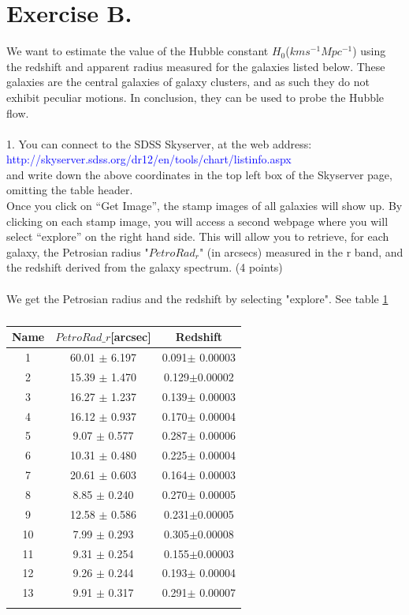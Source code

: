 \documentclass[11pt,a4paper,twoside]{article}
\begin{document}
	\section*{Exercise B.}
We want to estimate the value of the Hubble constant $H_0$($km s^{-1}Mpc^{-1}$) using the
redshift and apparent radius measured for the galaxies listed below. These galaxies are the
central galaxies of galaxy clusters, and as such they do not exhibit peculiar motions. In
conclusion, they can be used to probe the Hubble flow.\\
\\1. You can connect to the SDSS Skyserver, at the web address:\\
\textcolor{blue}{http://skyserver.sdss.org/dr12/en/tools/chart/listinfo.aspx}\\
and write down the above coordinates in the top left box of the Skyserver page, omitting the
table header.\\
Once you click on “Get Image”, the stamp images of all galaxies will show up. By clicking on
each stamp image, you will access a second webpage where you will select “explore” on the
right hand side. This will allow you to retrieve, for each galaxy, the Petrosian radius
"$PetroRad_r$" (in arcsecs) measured in the r band, and the redshift derived from the galaxy
spectrum. (4 points)\\
\\
We get the Petrosian radius and the redshift by selecting "explore". See table \ref{tab1}
\begin{table}
	\centering
	\begin{tabular}{ccc}
		Name& $PetroRad\_r$[arcsec]& Redshift\\
		\toprule
		1&60.01 $\pm$ 6.197& 0.091$\pm$ 0.00003\\
		2&15.39 $\pm$ 1.470& 0.129$\pm$0.00002\\
		3&16.27 $\pm$ 1.237& 0.139$\pm$ 0.00003\\
		4&16.12 $\pm$ 0.937&0.170$\pm$ 0.00004\\
		5&9.07 $\pm$ 0.577& 0.287$\pm$ 0.00006\\
		6&10.31 $\pm$ 0.480&0.225$\pm$ 0.00004\\
		7&20.61 $\pm$ 0.603&0.164$\pm$ 0.00003\\
		8&8.85 $\pm$ 0.240&0.270$\pm$ 0.00005\\
		9&12.58 $\pm$ 0.586&0.231$\pm$0.00005\\
		10&7.99 $\pm$ 0.293&0.305$\pm$0.00008\\
		11&9.31 $\pm$ 0.254&0.155$\pm$0.00003\\
		12&9.26 $\pm$ 0.244&0.193$\pm$ 0.00004\\
		13&9.91 $\pm$ 0.317&0.291$\pm$ 0.00007\\
		\label{tab1}
	\end{tabular}
	
	\caption{}
	
\end{table}
\end{document}
